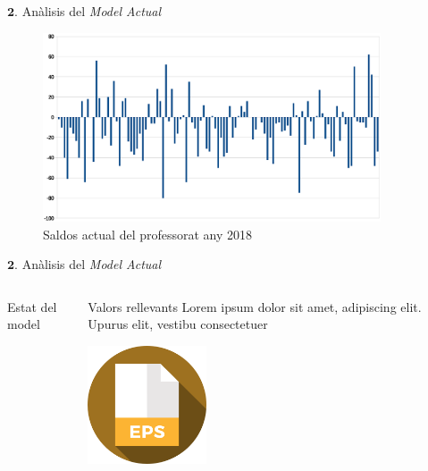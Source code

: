 \documentclass[twocolumn]{beamer}
\begin{document}
\begin{frame}{$\mathbf 2.$ Anàlisis del \textit{Model Actual}}
\begin{figure}
\includegraphics[width=10cm]{saldo_actual}
\caption{Saldos actual del professorat any 2018}
\end{figure}
\end{frame}
\begin{frame}{$\mathbf 2.$ Anàlisis del \textit{Model Actual}}
\begin{columns}[t]
	\begin{column}{.5\textwidth}
		\begin{block}{Estat del model}
		
		\end{block}
	\end{column}
	\begin{column}{.5\textwidth}
		\begin{block}{Valors rellevants}
			Lorem ipsum dolor sit amet,
			adipiscing elit. Upurus elit, vestibu
			consectetuer 
		\end{block}
		\includegraphics[width=3.5cm]{eps}
	\end{column}
\end{columns}
\end{frame}
\end{document}
